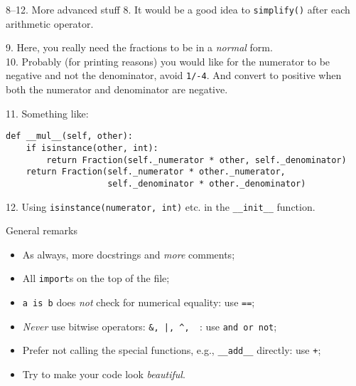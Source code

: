 \documentclass{beamer}
\begin{document}
\begin{frame}[fragile]{8--12. More advanced stuff}
8. It would be a good idea to \texttt{simplify()} after each
arithmetic operator. \\

\vfill

9. Here, you really need the fractions to be in a \emph{normal} form. \\

\vfill
10. Probably (for printing reasons) you would like for the numerator to
be negative and not the denominator, avoid \texttt{1/-4}. And
convert to positive when both the numerator and denominator are negative. \\

\vfill

11. Something like:
{
\small
\begin{verbatim}
def __mul__(self, other):
    if isinstance(other, int):
        return Fraction(self._numerator * other, self._denominator)
    return Fraction(self._numerator * other._numerator,
                    self._denominator * other._denominator)
\end{verbatim}
}
\vfill

12. Using \texttt{isinstance(numerator, int)} etc. in the
\texttt{__init__} function.
\end{frame}

\begin{frame}[fragile]{General remarks}
\begin{itemize}
\item As always, more docstrings and \emph{more} comments;
\item All \texttt{import}s on the top of the file;
\item \texttt{a is b} does \emph{not} check for numerical
equality: use \texttt{==};
\item \emph{Never} use bitwise operators: \texttt{&, |, ^, ~}:
use \texttt{and or not};
\item Prefer not calling the special functions, e.g.,
\texttt{__add__} directly: use \texttt{+};
\item Try to make your code look \emph{beautiful}.
\end{itemize}
\end{frame}
\end{document}
